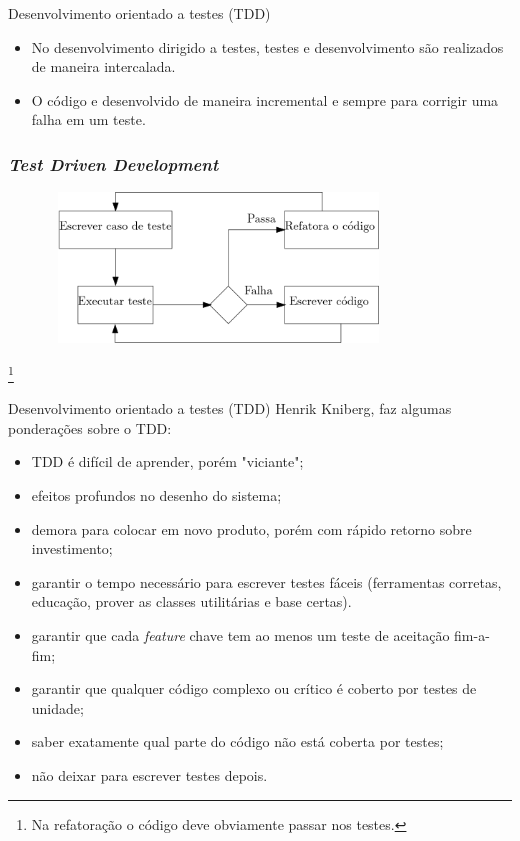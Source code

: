 \documentclass[11pt]{beamer}
\begin{document}
    \begin{frame}{Desenvolvimento orientado a testes (TDD)}
      \begin{itemize}
         \item No desenvolvimento dirigido a testes, testes e desenvolvimento são realizados de maneira intercalada.
         \item O código e desenvolvido de maneira incremental e sempre para corrigir uma falha em um teste.  
      \end{itemize}
    \end{frame}

    \begin{frame}
      \frametitle{\textit{Test Driven Development}}
      \begin{figure}[ht]
        \centering
        \includegraphics[height=4cm, width=9cm]{figures/fluxo_tdd.png}
      \end{figure}\footnote{Na refatoração o código deve obviamente passar nos testes.}
    \end{frame}

    \begin{frame}{Desenvolvimento orientado a testes (TDD)}
      Henrik Kniberg, faz algumas ponderações sobre o TDD:
      \begin{itemize}
         \item TDD é difícil de aprender, porém "viciante";
         \item efeitos profundos no desenho do sistema;
         \item demora para colocar em novo produto, porém com rápido retorno sobre investimento;
         \item garantir o tempo necessário para escrever testes fáceis (ferramentas corretas, educação, prover as classes utilitárias e base certas).
         \item garantir que cada \textit{feature} chave tem ao menos um teste de aceitação fim-a-fim;
         \item garantir que qualquer código complexo ou crítico é coberto por testes de unidade;
         \item saber exatamente qual parte do código não está coberta por testes;
         \item não deixar para escrever testes depois.
      \end{itemize}
    \end{frame}
\end{document}
